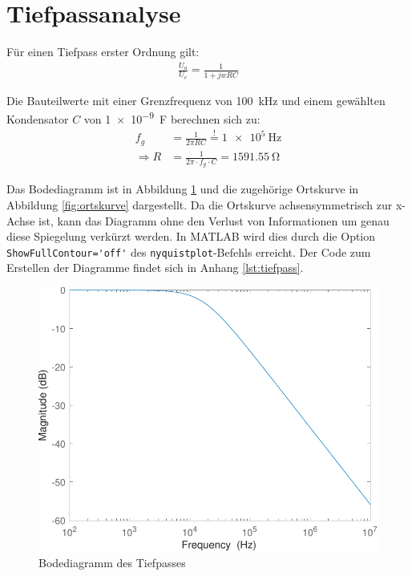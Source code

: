 \documentclass[
    paper=a4,
    fontsize=10pt,
    DIV=13,
    oneside,
]{scrartcl}
\begin{document}
\section{Tiefpassanalyse}
    Für einen Tiefpass erster Ordnung gilt:
    \begin{align}
        \label{eq:tp}
        \frac{U_a}{U_e} = \frac{1}{1+jwRC}
    \end{align}

    Die Bauteilwerte mit einer Grenzfrequenz von \SI{100}{\kilo\hertz} und einem gewählten Kondensator \(C\) von \SI{1e-9}{\farad} berechnen sich zu:
    \begin{align}
        f_g &= \frac{1}{2 \pi RC} \overset{!}{=} \SI{1e5}{\hertz}\\
        \Rightarrow R&= \frac{1}{2 \pi \cdot f_g \cdot C }= \SI{1591.55}{\ohm}
    \end{align}

    Das Bodediagramm ist in Abbildung \ref{fig:bode} und die zugehörige Ortskurve in Abbildung \ref{fig:ortskurve} dargestellt. Da die Ortskurve achsensymmetrisch zur x-Achse ist, kann das Diagramm ohne den Verlust von Informationen um genau diese Spiegelung verkürzt werden. In MATLAB wird dies durch die Option \verb|ShowFullContour='off'| des \verb|nyquistplot|-Befehls erreicht. Der Code zum Erstellen der Diagramme findet sich in Anhang \ref{lst:tiefpass}.

    \begin{figure}
        \centering
        \includegraphics[width=\imagewidth]{../versuch1/bode}
        \caption{Bodediagramm des Tiefpasses}
        \label{fig:bode}
    \end{figure}
\end{document}
